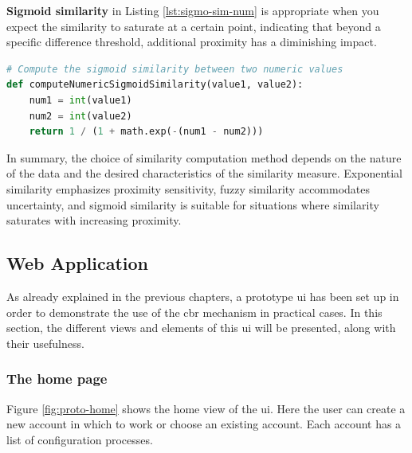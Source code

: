     
    \textbf{Sigmoid similarity} in Listing \ref{lst:sigmo-sim-num} is appropriate when you expect the similarity to saturate at a certain point, indicating that beyond a specific difference threshold, additional proximity has a diminishing impact.\\

\begin{lstlisting}[language=Python, caption=Function to compute the similarity value between two attributes, label={lst:sigmo-sim-num}]
# Compute the sigmoid similarity between two numeric values
def computeNumericSigmoidSimilarity(value1, value2):
    num1 = int(value1)
    num2 = int(value2)
    return 1 / (1 + math.exp(-(num1 - num2)))
\end{lstlisting}
        
In summary, the choice of similarity computation method depends on the nature of the data and the desired characteristics of the similarity measure. Exponential similarity emphasizes proximity sensitivity, fuzzy similarity accommodates uncertainty, and sigmoid similarity is suitable for situations where similarity saturates with increasing proximity.

\subsection{Web Application}
As already explained in the previous chapters, a prototype \acrshort{ui} has been set up in order to demonstrate the use of the \acrshort{cbr} mechanism in practical cases. In this section, the different views and elements of this \acrshort{ui} will be presented, along with their usefulness.

    \subsubsection{The home page}
    Figure \ref{fig:proto-home} shows the home view of the \acrshort{ui}. Here the user can create a new account in which to work or choose an existing account. Each account has a list of configuration processes.
    
